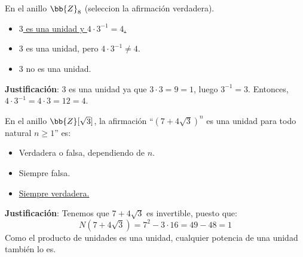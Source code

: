 \begin{ejercicio}
    En el anillo $\bb{Z}_8$ (seleccion la afirmación verdadera).
    \begin{itemize}
        \item \underline{$3$ es una unidad y $4 \cdot 3^{-1} = 4$.}
        \item $3$ es una unidad, pero $4 \cdot 3^{-1} \neq 4$.
        \item $3$ no es una unidad.
    \end{itemize}

    \noindent
    \textbf{Justificación}:
    $3$ es una unidad ya que $3 \cdot 3 = 9 = 1$, luego $3^{-1} = 3$.\newline
    Entonces, $4 \cdot 3^{-1} = 4 \cdot 3 = 12 = 4$.
\end{ejercicio}

\begin{ejercicio}
    En el anillo $\bb{Z}[\sqrt{3}]$, la afirmación ``${(7+4\sqrt{3})}^n$ es una unidad para todo natural $n \geq 1$'' es:
    \begin{itemize}
        \item Verdadera o falsa, dependiendo de $n$.
        \item Siempre falsa.
        \item \underline{Siempre verdadera.}
    \end{itemize}

    \noindent
    \textbf{Justificación}:
    Tenemos que $7 + 4\sqrt{3}$ es invertible, puesto que:
    \begin{equation*}
        N(7+4\sqrt{3}) = 7^2 - 3 \cdot 16 = 49 - 48 = 1
    \end{equation*}
    Como el producto de unidades es una unidad, cualquier potencia de una unidad también lo es.
\end{ejercicio}

